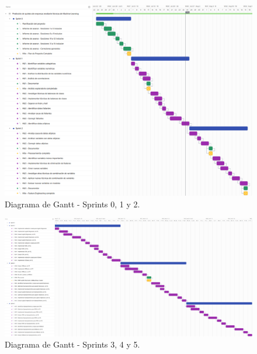 \documentclass[
11pt, %
]{charter}
\begin{document}

\pagebreak

\begin{landscape}
\begin{figure}[htpb]
\centering 
\includegraphics[width=1.2\textwidth]{./Figuras/Gantt-1.png}
\caption{Diagrama de Gantt - Sprints 0, 1 y 2.}
\label{fig:gantt1}
\end{figure}
\end{landscape}

\begin{landscape}
\begin{figure}[htpb]
\centering 
\includegraphics[width=1.5\textwidth]{./Figuras/Gantt-2.png}
\caption{Diagrama de Gantt - Sprints 3, 4 y 5.}
\label{fig:gantt2}
\end{figure}
\end{landscape}
\end{document}
